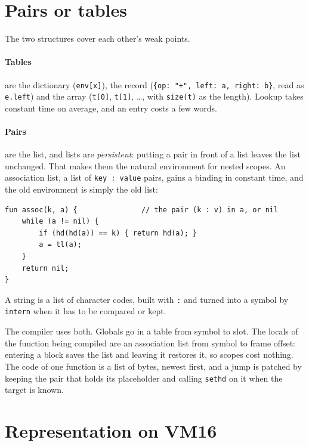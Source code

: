 \documentclass[11pt,a4paper]{article}
\newcommand{\vm}{VM16}
\begin{document}
\section{Pairs or tables}\label{sec:library}

The two structures cover each other's weak points.

\paragraph{Tables} are the dictionary (\verb|env[x]|), the record
(\verb|{op: "+", left: a, right: b}|, read as \verb|e.left|) and the array
(\verb|t[0]|, \verb|t[1]|, \ldots, with \texttt{size(t)} as the length).
Lookup takes constant time on average, and an entry costs a few words.

\paragraph{Pairs} are the list, and lists are \emph{persistent}: putting a
pair in front of a list leaves the list unchanged. That makes them the
natural environment for nested scopes. An association list, a list of
\verb|key : value| pairs, gains a binding in constant time, and the old
environment is simply the old list:
\begin{lstlisting}
fun assoc(k, a) {               // the pair (k : v) in a, or nil
    while (a != nil) {
        if (hd(hd(a)) == k) { return hd(a); }
        a = tl(a);
    }
    return nil;
}
\end{lstlisting}
A string is a list of character codes, built with \verb|:| and turned into
a symbol by \texttt{intern} when it has to be compared or kept.

The compiler uses both. Globals go in a table from symbol to slot. The
locals of the function being compiled are an association list from symbol to
frame offset: entering a block saves the list and leaving it restores it, so
scopes cost nothing. The code of one function is a list of bytes, newest
first, and a jump is patched by keeping the pair that holds its placeholder
and calling \texttt{sethd} on it when the target is known.

\section{Representation on \vm{}}\label{sec:repr}
\end{document}
